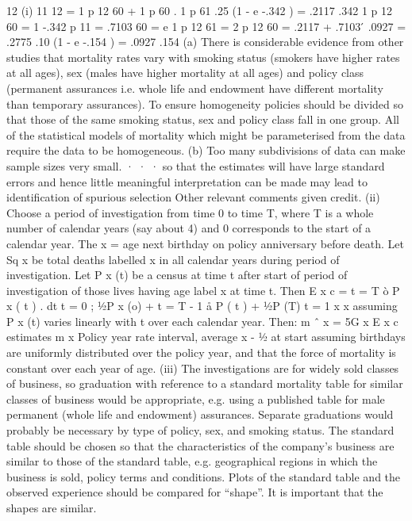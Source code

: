 12
(i)
11
12
= 1 p 12
60 + 1 p 60 . 1 p 61
.25
(1 - e -.342 ) = .2117
.342
1 p 12
60 =
1 -.342
p 11
= .7103
60 = e
1 p 12
61 =
2 p 12
60 = .2117 + .7103  ́ .0927 = .2775
.10
(1 - e -.154 ) = .0927
.154
(a) There is considerable evidence from other studies that mortality
rates vary with smoking status (smokers have higher rates at all
ages),
sex (males have higher mortality at all ages)
and policy class (permanent assurances i.e. whole life and
endowment have different mortality than temporary
assurances).
To ensure homogeneity policies should be divided so that those of
the same smoking status, sex and policy class fall in one group.
All of the statistical models of mortality which might be
parameterised from the data require the data to be
homogeneous.
(b) Too many subdivisions of data can make sample sizes very
small.
·
·
·
so that the estimates will have large standard errors
and hence little meaningful interpretation can be made
may lead to identification of spurious selection
Other relevant comments given credit.
(ii)
Choose a period of investigation from time 0 to time T, where T is a whole
number of calendar years (say about 4) and 0 corresponds to the start of a
calendar year.
The x = age next birthday on policy anniversary before death.
Let Sq x be total deaths labelled x in all calendar years during period of
investigation.
Let P x (t) be a census at time t after start of period of investigation of those
lives having age label x at time t. Then
E x c =
t = T
ò
P x ( t ) . dt
t = 0
; 1⁄2P x (o) +
t = T - 1
å P ( t ) + 1⁄2P (T)
t = 1
x
x
assuming P x (t) varies linearly with t over each calendar year.
Then: m ˆ x =
5G x
E x c
estimates m x
Policy year rate interval, average x - 1⁄2 at start assuming
birthdays are uniformly distributed over the policy year, and that the
force of mortality is constant over each year of age.
(iii)
The investigations are for widely sold classes of business, so graduation
with reference to a standard mortality table for similar classes of business
would be appropriate,
e.g. using a published table for male permanent (whole life and
endowment) assurances.
Separate graduations would probably be necessary by type of policy, sex,
and smoking status.
The standard table should be chosen so that the characteristics of the
company’s business are similar to those of the standard table, e.g.
geographical regions in which the business is sold, policy terms and
conditions.
Plots of the standard table and the observed experience should be
compared for “shape”. It is important that the shapes are similar.

